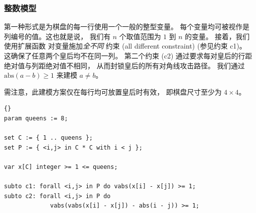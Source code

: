 \subsubsection{整数模型}
\label{nqueens}
第一种形式是为棋盘的每一行使用一个一般的整型变量。
每个变量均可被视作是列编号的值。这也就是说，
我们有 $n$ 个取值范围为 $1$ 到 $n$ 的变量。
接着，我们使用扩展函数  对变量施加\emph{全不同} 约束 
(all different constraint) (参见约束 c1)。
这确保了任意两个皇后均不在同一列。
第二个约束 (c2) 通过要求每对皇后的行距绝对值与列距绝对值不相同，
从而封锁皇后的所有对角线攻击路径。
我们通过 $\mbox{abs}(a-b)\geq 1$ 来建模 $a\neq b$。

需注意，此建模方案仅在每行均可放置皇后时有效，
即棋盘尺寸至少为 $4\times4$。

\medskip
\begin{lstlisting}[frame=tb]{}
param queens := 8;

set C := { 1 .. queens };
set P := { <i,j> in C * C with i < j };

var x[C] integer >= 1 <= queens;

subto c1: forall <i,j> in P do vabs(x[i] - x[j]) >= 1;
subto c2: forall <i,j> in P do
             vabs(vabs(x[i] - x[j]) - abs(i - j)) >= 1;
\end{lstlisting}

